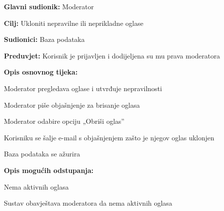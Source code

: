				
					\noindent {}
					\begin{packed_item}
						
						\item \textbf{Glavni sudionik: }Moderator
						\item  \textbf{Cilj:} Ukloniti nepravilne ili neprikladne oglase
						\item  \textbf{Sudionici:} Baza podataka
						\item  \textbf{Preduvjet:} Korisnik je prijavljen i dodijeljena su mu prava moderatora
						\item  \textbf{Opis osnovnog tijeka:}
						
						\item[] \begin{packed_enum}
							\item Moderator pregledava oglase i utvrđuje nepravilnosti
							\item Moderator piše objašnjenje za brisanje oglasa 
							\item Moderator odabire opciju „Obriši oglas”
							\item Korisniku se šalje e-mail s objašnjenjem zašto je njegov oglas uklonjen
							\item Baza podataka se ažurira
							
						\end{packed_enum}
						
						\item  \textbf{Opis mogućih odstupanja:}
						
						\item[] \begin{packed_item}
							
							\item[1.a] Nema aktivnih oglasa
							\item[] \begin{packed_enum}
								\item Sustav obavještava moderatora da nema aktivnih oglasa
							\end{packed_enum}
							
						\end{packed_item}
					\end{packed_item}
				
